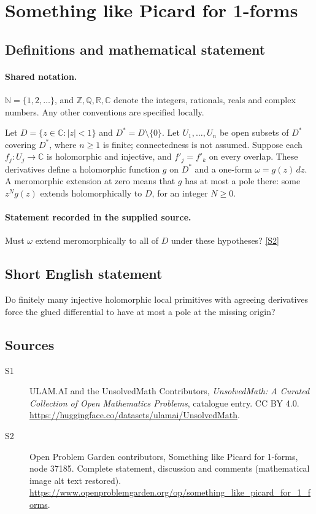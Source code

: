 \documentclass[11pt]{book}
\newcommand{\sref}[2]{\hyperlink{source:#1:#2}{[S#2]}}
\begin{document}
\section{Something like Picard for 1-forms}\label{statement}

\subsection{Definitions and mathematical statement}

\paragraph{Shared notation.}$\mathbb N=\{1,2,\ldots\}$, and $\mathbb Z,\mathbb Q,\mathbb R,\mathbb C$ denote the integers, rationals, reals and complex numbers. Any other conventions are specified locally.


Let $D=\{z\in\mathbb C:|z|<1\}$ and $D^*=D\setminus\{0\}$. Let $U_1,\ldots,U_n$ be open subsets of $D^*$ covering $D^*$, where $n\geq1$ is finite; connectedness is not assumed. Suppose each $f_j:U_j\to\mathbb C$ is holomorphic and injective, and $f'_j=f'_k$ on every overlap. These derivatives define a holomorphic function $g$ on $D^*$ and a one-form $\omega=g(z)\,dz$. A meromorphic extension at zero means that $g$ has at most a pole there: some $z^N g(z)$ extends holomorphically to $D$, for an integer $N\geq0$.
\paragraph{Statement recorded in the supplied source.}
Must $\omega$ extend meromorphically to all of $D$ under these hypotheses? \sref{statement}{2}
\subsection{Short English statement}
Do finitely many injective holomorphic local primitives with agreeing derivatives force the glued differential to have at most a pole at the missing origin?
\subsection{Sources}
\begin{description}
\item[\hypertarget{source:statement:1}{S1}] ULAM.AI and the UnsolvedMath Contributors, \emph{UnsolvedMath: A Curated Collection of Open Mathematics Problems}, catalogue entry. CC BY 4.0. \url{https://huggingface.co/datasets/ulamai/UnsolvedMath}.
\item[\hypertarget{source:statement:2}{S2}] Open Problem Garden contributors, Something like Picard for 1-forms, node 37185. Complete statement, discussion and comments (mathematical image alt text restored). \url{https://www.openproblemgarden.org/op/something_like_picard_for_1_forms}.
\end{description}
\label{end:statement}
\end{document}
